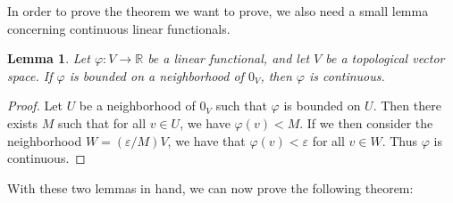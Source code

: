 \documentclass[a4paper,12pt]{report}
\newcommand{\varep}{ \varepsilon }
\newcommand{\vphi} {\varphi}
\newtheorem{lemma}[theorem]{Lemma}
\begin{document}
	\noindent In order to prove the theorem we want to prove, we also need a small lemma concerning continuous linear functionals.
	
	\begin{lemma}
	Let $\vphi : V \rightarrow \mathbb{R}$ be a linear functional, and let $V$ be a topological vector space. If $\vphi$ is bounded on a neighborhood of $0_V$, then $\vphi$ is continuous.
	\end{lemma}
	\begin{proof}
	Let $U$ be a neighborhood of $0_V$ such that $\vphi$ is bounded on $U$. Then there exists $M$ such that for all $v \in U$, we have $\vphi(v) < M$. If we then consider the neighborhood $W = (\varep/M)V$, we have that $\vphi(v) < \varep$ for all $v \in W$. Thus $\vphi$ is continuous.
	\end{proof}
	
	\noindent With these two lemmas in hand, we can now prove the following theorem:
	
\end{document}
